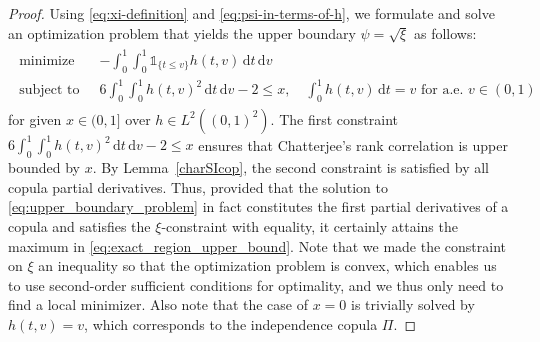 \documentclass{article}
\newcommand{\1}{\mathds{1}}
\newcommand{\de}{\mathrm{\,d}}
\begin{document}
\begin{proof}
Using \eqref{eq:xi-definition} and \eqref{eq:psi-in-terms-of-h}, we formulate and solve an optimization problem that yields the upper boundary \(\psi = \sqrt{\xi}\) as follows:
\begin{align}
    \label{eq:upper_boundary_problem}
    \begin{aligned}
    \text{minimize} \quad &-\int_0^1\int_0^1 \1_{\{t\le v\}} h(t,v) \de t \de v \\
    \text{subject to} \quad
    & 6 \int_0^1\int_0^1 h(t,v)^2 \de t \de v - 2 \le x, \quad \int_0^1 h(t,v) \de t = v \text{ for a.e.~} v \in (0,1)
    \end{aligned}
\end{align}
for given \(x \in (0,1]\) over $h\in L^2((0,1)^2)$.
The first constraint \(6 \int_0^1\int_0^1 h(t,v)^2 \de t \de v - 2 \le x\) ensures that Chatterjee's rank correlation is upper bounded by \(x\).
By Lemma~\ref{charSIcop}, the second constraint is satisfied by all copula partial derivatives.
Thus, provided that the solution to \eqref{eq:upper_boundary_problem} in fact constitutes the first partial derivatives of a copula and satisfies the $\xi$-constraint with equality, it certainly attains the maximum in \eqref{eq:exact_region_upper_bound}.
Note that we made the constraint on $\xi$ an inequality so that the optimization problem is convex, which enables us to use second-order sufficient conditions for optimality, and we thus only need to find a local minimizer.
Also note that the case of $x=0$ is trivially solved by $h(t,v) = v$, which corresponds to the independence copula $\Pi$.


\end{proof}
\end{document}
